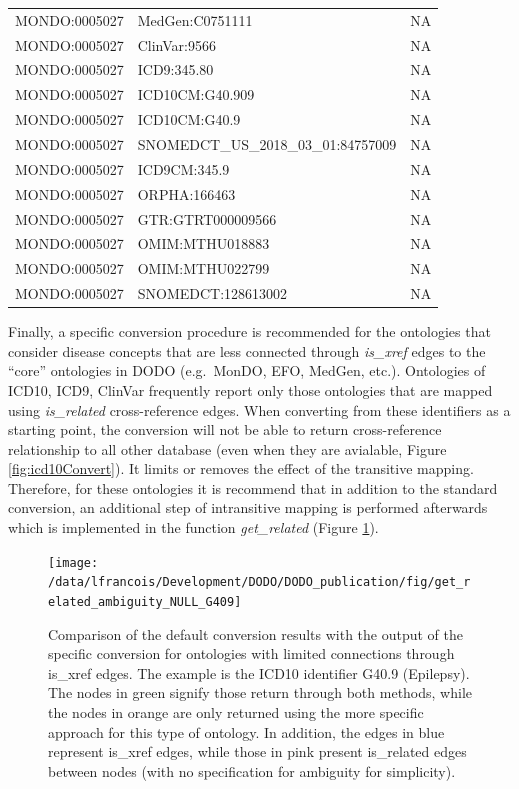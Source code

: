 \documentclass[9pt,a4paper,]{extarticle}
\begin{document}
\begin{table}
{\begin{tabular}[t]{lll}
MONDO:0005027 & MedGen:C0751111 & NA\\
\rowcolor{gray!6}  MONDO:0005027 & ClinVar:9566 & NA\\
MONDO:0005027 & ICD9:345.80 & NA\\
\rowcolor{gray!6}  MONDO:0005027 & ICD10CM:G40.909 & NA\\
\addlinespace
MONDO:0005027 & ICD10CM:G40.9 & NA\\
\rowcolor{gray!6}  MONDO:0005027 & SNOMEDCT\_US\_2018\_03\_01:84757009 & NA\\
MONDO:0005027 & ICD9CM:345.9 & NA\\
\rowcolor{gray!6}  MONDO:0005027 & ORPHA:166463 & NA\\
MONDO:0005027 & GTR:GTRT000009566 & NA\\
\addlinespace
\rowcolor{gray!6}  MONDO:0005027 & OMIM:MTHU018883 & NA\\
MONDO:0005027 & OMIM:MTHU022799 & NA\\
\rowcolor{gray!6}  MONDO:0005027 & SNOMEDCT:128613002 & NA\\
\bottomrule
\end{tabular}}
\end{table}

Finally, a specific conversion procedure is recommended for the ontologies that consider disease concepts that are less connected through \emph{is\_xref} edges to the ``core'' ontologies in DODO (e.g.~MonDO, EFO, MedGen, etc.). Ontologies of ICD10, ICD9, ClinVar frequently report only those ontologies that are mapped using \emph{is\_related} cross-reference edges. When converting from these identifiers as a starting point, the conversion will not be able to return cross-reference relationship to all other database (even when they are avialable, Figure \ref{fig:icd10Convert}). It limits or removes the effect of the transitive mapping. Therefore, for these ontologies it is recommend that in addition to the standard conversion, an additional step of intransitive mapping is performed afterwards which is implemented in the function \emph{get\_related} (Figure \ref{fig:getRelated}).

\begin{figure}

{\centering \texttt{[image: /data/lfrancois/Development/DODO/DODO\_publication/fig/get\_related\_ambiguity\_NULL\_G409]} 

}

\caption{Comparison of the default conversion results with the output of the specific conversion for ontologies with limited connections through is\_xref edges. The example is the ICD10 identifier G40.9 (Epilepsy). The nodes in green signify those return through both methods, while the nodes in orange are only returned using the more specific approach for this type of ontology. In addition, the edges in blue represent is\_xref edges, while those in pink present is\_related edges between nodes (with no specification for ambiguity for simplicity).}\label{fig:getRelated}
\end{figure}
\end{document}
